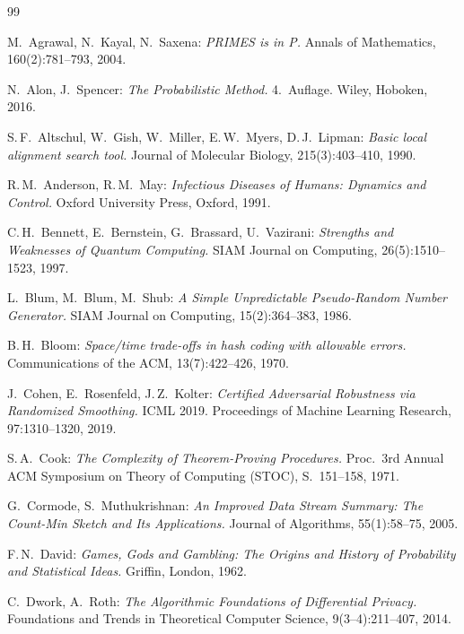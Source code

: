 ﻿\documentclass[12pt,a4paper]{article}
\theoremstyle{definition}
\theoremstyle{plain}
\theoremstyle{remark}
\begin{document}
\begin{thebibliography}{99}

M.\ Agrawal, N.\ Kayal, N.\ Saxena:
\textit{PRIMES is in P.}
Annals of Mathematics, 160(2):781--793, 2004.

N.\ Alon, J.\ Spencer:
\textit{The Probabilistic Method.}
4.~Auflage.
Wiley, Hoboken, 2016.

S.\,F.\ Altschul, W.\ Gish, W.\ Miller, E.\,W.\ Myers, D.\,J.\ Lipman:
\textit{Basic local alignment search tool.}
Journal of Molecular Biology, 215(3):403--410, 1990.

R.\,M.\ Anderson, R.\,M.\ May:
\textit{Infectious Diseases of Humans: Dynamics and Control.}
Oxford University Press, Oxford, 1991.

C.\,H.\ Bennett, E.\ Bernstein, G.\ Brassard, U.\ Vazirani:
\textit{Strengths and Weaknesses of Quantum Computing.}
SIAM Journal on Computing, 26(5):1510--1523, 1997.

L.\ Blum, M.\ Blum, M.\ Shub:
\textit{A Simple Unpredictable Pseudo-Random Number Generator.}
SIAM Journal on Computing, 15(2):364--383, 1986.

B.\,H.\ Bloom:
\textit{Space/time trade-offs in hash coding with allowable errors.}
Communications of the ACM, 13(7):422--426, 1970.

J.\ Cohen, E.\ Rosenfeld, J.\,Z.\ Kolter:
\textit{Certified Adversarial Robustness via Randomized Smoothing.}
ICML 2019. Proceedings of Machine Learning Research, 97:1310--1320, 2019.

S.\,A.\ Cook:
\textit{The Complexity of Theorem-Proving Procedures.}
Proc.\ 3rd Annual ACM Symposium on Theory of Computing (STOC), S.~151--158, 1971.

G.\ Cormode, S.\ Muthukrishnan:
\textit{An Improved Data Stream Summary: The Count-Min Sketch and Its Applications.}
Journal of Algorithms, 55(1):58--75, 2005.

F.\,N.\ David:
\textit{Games, Gods and Gambling: The Origins and History of Probability and Statistical Ideas.}
Griffin, London, 1962.

C.\ Dwork, A.\ Roth:
\textit{The Algorithmic Foundations of Differential Privacy.}
Foundations and Trends in Theoretical Computer Science, 9(3--4):211--407, 2014.


\end{thebibliography}
\end{document}

